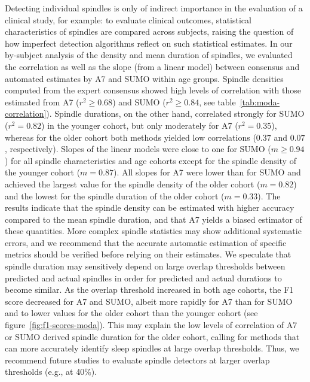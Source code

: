 \documentclass[fleqn,twocolumn,10pt]{wlscirep}
\begin{document}
Detecting individual spindles is only of indirect importance in the evaluation
of a clinical study, for example: to evaluate clinical outcomes, statistical
characteristics of spindles are compared across subjects, raising the question
of how imperfect detection algorithms reflect on such statistical estimates.
In our by-subject analysis of the density and mean duration of spindles, we
evaluated the correlation as well as the slope (from a linear model) between
consensus and automated estimates by A7 and SUMO within age groups.
Spindle densities computed from the expert consensus showed high levels of
correlation with those estimated from A7 ($r^2 \geq 0.68$) and SUMO ($r^2 \geq
0.84$, see table~\ref{tab:moda-correlation}).  Spindle durations, on the other
hand, correlated strongly for SUMO ($r^2 = 0.82$) in the younger cohort, but
only moderately for A7 ($r^2=0.35$), whereas for the older cohort both methods
yielded low correlations ($0.37$ and $0.07$, respectively).
Slopes of the linear models were close to one for SUMO ($m\geq 0.94$) for all
spindle characteristics and age cohorts except for the spindle density of the
younger cohort ($m=0.87$). All slopes for A7 were lower than for SUMO and
achieved the largest value for the spindle density of the older cohort
($m=0.82$) and the lowest for the spindle duration of the older cohort
($m=0.33$).
The results indicate that the spindle density can be estimated with higher
accuracy compared to the mean spindle duration, and that A7 yields a biased
estimator of these quantities.  More complex spindle statistics may show
additional systematic errors, and we recommend that the accurate automatic
estimation of specific metrics should be verified before relying on their
estimates.
We speculate that spindle duration may sensitively depend on large overlap
thresholds between predicted and actual spindles in order for predicted and
actual durations to become similar. As the overlap threshold increased in both
age cohorts, the F1 score decreased for A7 and SUMO, albeit more rapidly for A7
than for SUMO and to lower values for the older cohort than the younger cohort
(see figure~\ref{fig:f1-scores-moda}). This may explain the low levels of
correlation of A7 or SUMO derived spindle duration for the older cohort,
calling for methods that can more accurately identify sleep spindles at large
overlap thresholds.
Thus, we recommend future studies to evaluate spindle detectors at larger overlap
thresholds (e.g., at 40\%).
\end{document}
